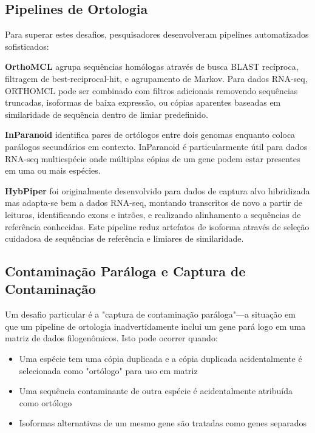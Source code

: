 \subsection{Pipelines de Ortologia}

Para superar estes desafios, pesquisadores desenvolveram pipelines automatizados sofisticados:

\textbf{OrthoMCL} agrupa sequências homólogas através de busca BLAST recíproca, filtragem de best-reciprocal-hit, e agrupamento de Markov. Para dados RNA-seq, ORTHOMCL pode ser combinado com filtros adicionais removendo sequências truncadas, isoformas de baixa expressão, ou cópias aparentes baseadas em similaridade de sequência dentro de limiar predefinido.

\textbf{InParanoid} identifica pares de ortólogos entre dois genomas enquanto coloca parálogos secundários em contexto. InParanoid é particularmente útil para dados RNA-seq multiespécie onde múltiplas cópias de um gene podem estar presentes em uma ou mais espécies.

\textbf{HybPiper} foi originalmente desenvolvido para dados de captura alvo hibridizada mas adapta-se bem a dados RNA-seq, montando transcritos de novo a partir de leituras, identificando exons e intrões, e realizando alinhamento a sequências de referência conhecidas. Este pipeline reduz artefatos de isoforma através de seleção cuidadosa de sequências de referência e limiares de similaridade.

\subsection{Contaminação Paráloga e Captura de Contaminação}

Um desafio particular é a "captura de contaminação paráloga"---a situação em que um pipeline de ortologia inadvertidamente inclui um gene pará logo em uma matriz de dados filogenômicos. Isto pode ocorrer quando:

\begin{itemize}
\item Uma espécie tem uma cópia duplicada e a cópia duplicada acidentalmente é selecionada como "ortólogo" para uso em matriz
\item Uma sequência contaminante de outra espécie é acidentalmente atribuída como ortólogo
\item Isoformas alternativas de um mesmo gene são tratadas como genes separados
\end{itemize}

